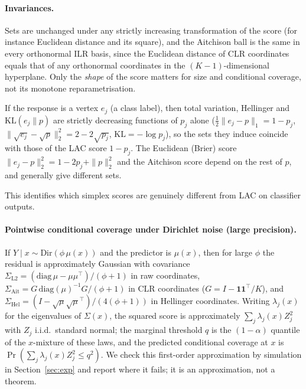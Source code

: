 \paragraph{Invariances.} Sets are unchanged under any strictly increasing transformation of the score (for instance Euclidean distance and its square), and the Aitchison ball is the same in every orthonormal ILR basis, since the Euclidean distance of CLR coordinates equals that of any orthonormal coordinates in the $(K-1)$-dimensional hyperplane. Only the \emph{shape} of the score matters for size and conditional coverage, not its monotone reparametrisation.


\begin{proposition}\label{prop:vertex}
If the response is a vertex $e_j$ (a class label), then total variation, Hellinger and $\mathrm{KL}(e_j\|p)$ are strictly decreasing functions of $p_j$ alone ($\tfrac12\|e_j-p\|_1=1-p_j$, $\|\sqrt{e_j}-\sqrt p\|_2^2=2-2\sqrt{p_j}$, $\mathrm{KL}=-\log p_j$), so the sets they induce coincide with those of the LAC score $1-p_j$. The Euclidean (Brier) score $\|e_j-p\|_2^2=1-2p_j+\|p\|_2^2$ and the Aitchison score depend on the rest of $p$, and generally give different sets.
\end{proposition}
This identifies which simplex scores are genuinely different from LAC on classifier outputs.

\paragraph{Pointwise conditional coverage under Dirichlet noise (large precision).} If $Y\mid x\sim\mathrm{Dir}(\phi\,\mu(x))$ and the predictor is $\mu(x)$, then for large $\phi$ the residual is approximately Gaussian with covariance $\Sigma_{\mathrm{L2}}=(\mathrm{diag}\,\mu-\mu\mu^\top)/(\phi+1)$ in raw coordinates, $\Sigma_{\mathrm{Ait}}=G\,\mathrm{diag}(\mu)^{-1}G/(\phi+1)$ in CLR coordinates ($G=I-\mathbf 1\mathbf 1^\top/K$), and $\Sigma_{\mathrm{Hel}}=(I-\sqrt\mu\sqrt\mu^\top)/(4(\phi+1))$ in Hellinger coordinates. Writing $\lambda_j(x)$ for the eigenvalues of $\Sigma(x)$, the squared score is approximately $\sum_j\lambda_j(x)Z_j^2$ with $Z_j$ i.i.d.\ standard normal; the marginal threshold $q$ is the $(1-\alpha)$ quantile of the $x$-mixture of these laws, and the predicted conditional coverage at $x$ is $\Pr(\sum_j\lambda_j(x)Z_j^2\le q^2)$. We check this first-order approximation by simulation in Section~\ref{sec:exp} and report where it fails; it is an approximation, not a theorem.
